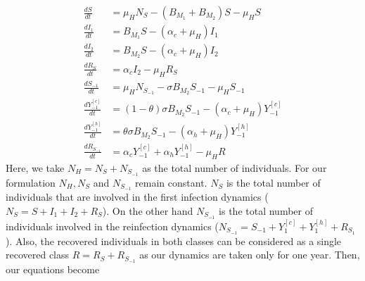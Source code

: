 \begin{equation}\label{eqn:model_two_strains1}
    \begin{aligned}
        \frac{dS}{dt} &=
            \mu_HN_S - (B_{M_1} + B_{M_2}) S
            -\mu_H S
        \\
        \frac{dI_1}{dt} &=
            B_{M_1} S
            -(\alpha_c + \mu_H) I_1
        \\
        \frac{dI_2}{dt} &=
            B_{M_2} S
            -(\alpha_c + \mu_H)I_2
        \\
        \frac{dR_S}{dt}&=\alpha_c I_2-\mu_H R_S
        \\
        \frac{dS_{-1}}{dt} &=
            \mu_HN_{S_{-1}}- \sigma B_{M_2} S_{-1}-\mu_H S_{-1}
        \\
        \frac{dY_{-1} ^{[c]} }{dt} &=
            (1 - \theta) \sigma B_{M_2} S_{-1}
            -(\alpha_c + \mu_H) Y_{-1} ^ {[c]}
        \\
        \frac{dY_{-1}^{[h]}}{dt} &=
            \theta \sigma B_{M_2} S_{-1}
            -(\alpha_h + \mu_H)Y_{-1} ^{[h]} 
        \\
        \frac{dR_{S_{-1}}}{dt} &= 
            \alpha_c Y_{-1} ^{[c]}
            + \alpha_h Y_{-1} ^ {[h]} - \mu_H R
    \end{aligned}
\end{equation}
    Here, we take $N_H=N_S+N_{S_{-1}}$ as the total number of individuals.
    For our formulation $N_H, N_S$ and $N_{S_{-1}}$ remain constant. $N_S$
    is the total number of individuals that are involved in the first
    infection dynamics ($N_S = S +I_1+I_2+R_S$). On the other hand
    $N_{S_{-1}}$ is the total number of individuals involved in the
    reinfection dynamics ($N_{S_{-1}}=S_{-1}+Y_1^{[c]}+
    Y_1^{[h]}+R_{S_1}$). Also, the recovered individuals in both classes
    can be considered as a single recovered class $R=R_S+R_{S_{-1}}$ as
    our dynamics are taken only for one year. Then, our equations become

